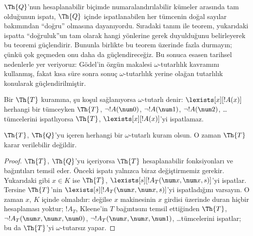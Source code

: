 



\begin{explain}
$\Th{Q}$'nun hesaplanabilir biçimde numaralandırılabilir kümeler arasında
tam olduğunun ispatı, $\Th{Q}$ içinde ispatlanabilen her tümcenin doğal
sayılar bakımından “doğru” olmasına dayanıyordu. Sıradaki tanım ile teorem,
yukarıdaki ispatta “doğruluk”un tam olarak hangi yönlerine gerek
duyulduğunu belirleyerek bu teoremi güçlendirir. Bununla birlikte bu teorem
üzerinde fazla durmayın; çünkü çok geçmeden onu daha da güçlendireceğiz. Bu
sonuca esasen tarihsel nedenlerle yer veriyoruz: G\"odel'in özgün makalesi
$\omega$-tutarlılık kavramını kullanmış, fakat kısa süre sonra sonuç
$\omega$-tutarlılık yerine olağan tutarlılık konularak güçlendirilmiştir.
\end{explain}

\begin{defn}
Bir $\Th{T}$ kuramına, şu koşul sağlanıyorsa $\omega$-tutarlı denir:
$\lexists[x][!A(x)]$ herhangi bir tümceyken $\Th{T}$,
$\lnot !A(\num 0)$, $\lnot !A(\num 1)$, $\lnot !A(\num 2)$, \dots
tümcelerini ispatlıyorsa $\Th{T}$, $\lexists[x][!A(x)]$'yi ispatlamaz.
\end{defn}

\begin{thm}
  $\Th{T}$, $\Th{Q}$'yu içeren herhangi bir $\omega$-tutarlı kuram olsun.
  O zaman $\Th{T}$ karar verilebilir değildir.
\end{thm}

\begin{proof}
$\Th{T}$, $\Th{Q}$'yu içeriyorsa $\Th{T}$ hesaplanabilir fonksiyonları ve
bağıntıları temsil eder. Önceki ispatı yalnızca biraz değiştirmemiz gerekir.
Yukarıdaki gibi $x \in K$ ise $\Th{T}$,
$\lexists[s][!A_T(\num x,\num x, s)]$'yi ispatlar. Tersine $\Th{T}$'nin
$\lexists[s][!A_T(\num x, \num x, s)]$'yi ispatladığını varsayın. O zaman
$x$, $K$ içinde olmalıdır: değilse $x$ makinesinin $x$ girdisi üzerinde
duran hiçbir hesaplaması yoktur; $!A_T$, Kleene'in $T$ bağıntısını temsil
ettiğinden $\Th{T}$, $\lnot !A_T(\num x, \num x, \num 0)$,
$\lnot !A_T(\num x, \num x, \num 1)$, \dots tümcelerini ispatlar; bu da
$\Th{T}$'yi $\omega$-tutarsız yapar.
\end{proof}

